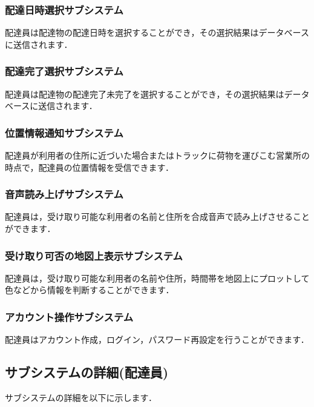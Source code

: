 \documentclass[a4j,titlepage]{jarticle}
\begin{document}
\subsubsection{配達日時選択サブシステム}
配達員は配達物の配達日時を選択することができ，その選択結果はデータベースに送信されます．

\subsubsection{配達完了選択サブシステム}
配達員は配達物の配達完了未完了を選択することができ，その選択結果はデータベースに送信されます．

\subsubsection{位置情報通知サブシステム}
配達員が利用者の住所に近づいた場合またはトラックに荷物を運びこむ営業所の時点で，配達員の位置情報を受信できます．

\subsubsection{音声読み上げサブシステム}
配達員は，受け取り可能な利用者の名前と住所を合成音声で読み上げさせることができます．

\subsubsection{受け取り可否の地図上表示サブシステム}
配達員は，受け取り可能な利用者の名前や住所，時間帯を地図上にプロットして色などから情報を判断することができます．

\subsubsection{アカウント操作サブシステム}
配達員はアカウント作成，ログイン，パスワード再設定を行うことができます．

\subsection{サブシステムの詳細(配達員)}
サブシステムの詳細を以下に示します．
\end{document}
